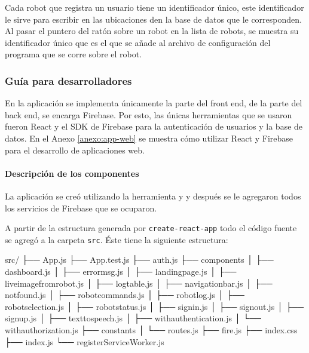 Cada robot que registra un usuario tiene un identificador único, este identificador
le sirve para escribir en las ubicaciones den la base de datos que le corresponden.
Al pasar el puntero del ratón sobre un robot en la lista de robots, se muestra
su identificador único que es el que se añade al archivo de configuración
del programa que se corre sobre el robot.


\subsubsection{Guía para desarrolladores}
\label{\detokenize{code_docs:documentacion-para-desarrolladores}}\label{\detokenize{code_docs::doc}}
En la aplicación se implementa únicamente la parte del front end, de la parte
del back end, se encarga Firebase. Por esto, las únicas herramientas que se
usaron fueron React y el SDK de Firebase para la autenticación de usuarios y la base
de datos.
En el Anexo \ref{anexo:app-web} se muestra cómo 
utilizar React y Firebase para el desarrollo
de aplicaciones web.



\paragraph{Descripción de los componentes}
\label{\detokenize{code_docs:creacion-del-proyecto}}

La aplicación se creó utilizando la herramienta
 y 
y después se le agregaron todos los servicios de Firebase
que se ocuparon. 

A partir de la estructura generada por \texttt{create-react-app}
todo el código fuente se agregó a la carpeta
\texttt{src}. Éste tiene la siguiente estructura:


%
\begin{sphinxVerbatim}[commandchars=\\\{\}]
src/
├── App.js
├── App.test.js
├── auth.js
├── components
│   ├── dashboard.js
│   ├── error\PYGZus{}msg.js
│   ├── landing\PYGZus{}page.js
│   ├── live\PYGZus{}image\PYGZus{}from\PYGZus{}robot.js
│   ├── log\PYGZus{}table.js
│   ├── navigation\PYGZus{}bar.js
│   ├── not\PYGZus{}found.js
│   ├── robot\PYGZus{}commands.js
│   ├── robot\PYGZus{}log.js
│   ├── robot\PYGZus{}selection.js
│   ├── robot\PYGZus{}status.js
│   ├── signin.js
│   ├── signout.js
│   ├── signup.js
│   ├── text\PYGZus{}to\PYGZus{}speech.js
│   ├── with\PYGZus{}authentication.js
│   └── with\PYGZus{}authorization.js
├── constants
│   └── routes.js
├── fire.js
├── index.css
├── index.js
└── registerServiceWorker.js
\end{sphinxVerbatim}


